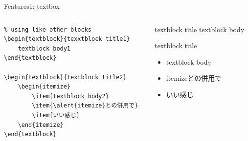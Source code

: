 \documentclass[aspectratio=1610,14pt]{beamer}
\begin{document}
\begin{frame}[fragile]{Features1: textbox}
    \begin{columns}
        \begin{column}{0.5\textwidth}
            \begin{lstlisting}
% using like other blocks
\begin{textblock}{texxtblock title1}
    textblock body1
\end{textblock}

\begin{textblock}{textblock title2}
    \begin{itemize}
        \item{textblock body2}
        \item{\alert{itemize}との併用で}
        \item{いい感じ}
    \end{itemize}
\end{textblock}
            \end{lstlisting}
        \end{column}
        \begin{column}{0.5\textwidth}
            \begin{textblock}{textblock title}
                textblock body
            \end{textblock}
            \begin{textblock}{textblock title}
                \begin{itemize}
                    \item{textblock body}
                    \item{\alert{itemize}との併用で}
                    \item{いい感じ}
                \end{itemize}
            \end{textblock}
        \end{column}
    \end{columns}
\end{frame}
\end{document}
